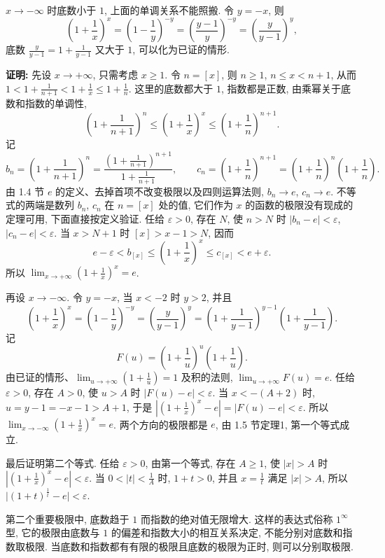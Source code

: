 \documentclass[UTF8,openany]{ctexbook}
\theoremstyle{chinesetextbook}
\newenvironment{cnproof}{\par\indent\textbf{证明:} \ignorespaces}{\par}
\begin{document}
$x\to-\infty$ 时底数小于 $1$, 上面的单调关系不能照搬. 令 $y=-x$, 则
\[
\left(1+\frac1x\right)^x=\left(1-\frac1y\right)^{-y}=\left(\frac{y-1}y\right)^{-y}=\left(\frac y{y-1}\right)^y,
\]
底数 $\displaystyle\frac y{y-1}=1+\frac1{y-1}$ 又大于 $1$, 可以化为已证的情形.
\begin{cnproof}
先设 $x\to+\infty$, 只需考虑 $x\ge1$. 令 $n=[x]$, 则 $n\ge1$, $n\le x<n+1$, 从而 $\displaystyle1<1+\frac1{n+1}<1+\frac1x\le1+\frac1n$. 这里的底数都大于 $1$, 指数都是正数, 由乘幂关于底数和指数的单调性,
\[
\left(1+\frac1{n+1}\right)^n\le\left(1+\frac1x\right)^x\le\left(1+\frac1n\right)^{n+1}.
\]
记
\[
b_n=\left(1+\frac1{n+1}\right)^n=\frac{\left(1+\frac1{n+1}\right)^{n+1}}{1+\frac1{n+1}},\qquad c_n=\left(1+\frac1n\right)^{n+1}=\left(1+\frac1n\right)^n\left(1+\frac1n\right).
\]
由 1.4 节 $e$ 的定义、去掉首项不改变极限以及四则运算法则, $b_n\to e$, $c_n\to e$. 不等式的两端是数列 $b_n$, $c_n$ 在 $n=[x]$ 处的值, 它们作为 $x$ 的函数的极限没有现成的定理可用, 下面直接按定义验证. 任给 $\varepsilon>0$, 存在 $N$, 使 $n>N$ 时 $|b_n-e|<\varepsilon$, $|c_n-e|<\varepsilon$. 当 $x>N+1$ 时 $[x]>x-1>N$, 因而
\[
e-\varepsilon<b_{[x]}\le\left(1+\frac1x\right)^x\le c_{[x]}<e+\varepsilon.
\]
所以 $\displaystyle\lim_{x\to+\infty}\left(1+\frac1x\right)^x=e$.

再设 $x\to-\infty$. 令 $y=-x$, 当 $x<-2$ 时 $y>2$, 并且
\[
\left(1+\frac1x\right)^x=\left(1-\frac1y\right)^{-y}=\left(\frac y{y-1}\right)^y=\left(1+\frac1{y-1}\right)^{y-1}\left(1+\frac1{y-1}\right).
\]
记
\[
F(u)=\left(1+\frac1u\right)^u\left(1+\frac1u\right).
\]
由已证的情形、$\displaystyle\lim_{u\to+\infty}\left(1+\frac1u\right)=1$ 及积的法则, $\displaystyle\lim_{u\to+\infty}F(u)=e$. 任给 $\varepsilon>0$, 存在 $A>0$, 使 $u>A$ 时 $|F(u)-e|<\varepsilon$. 当 $x<-(A+2)$ 时, $u=y-1=-x-1>A+1$, 于是 $\displaystyle\left|\left(1+\frac1x\right)^x-e\right|=|F(u)-e|<\varepsilon$. 所以 $\displaystyle\lim_{x\to-\infty}\left(1+\frac1x\right)^x=e$. 两个方向的极限都是 $e$, 由 1.5 节定理1, 第一个等式成立.

最后证明第二个等式. 任给 $\varepsilon>0$, 由第一个等式, 存在 $A\ge1$, 使 $|x|>A$ 时 $\displaystyle\left|\left(1+\frac1x\right)^x-e\right|<\varepsilon$. 当 $\displaystyle0<|t|<\frac1A$ 时, $1+t>0$, 并且 $\displaystyle x=\frac1t$ 满足 $|x|>A$, 所以 $\bigl|(1+t)^{\frac1t}-e\bigr|<\varepsilon$.
\end{cnproof}
第二个重要极限中, 底数趋于 $1$ 而指数的绝对值无限增大. 这样的表达式俗称 $1^\infty$ 型, 它的极限由底数与 $1$ 的偏差和指数大小的相互关系决定, 不能分别对底数和指数取极限. 当底数和指数都有有限的极限且底数的极限为正时, 则可以分别取极限.
\end{document}
